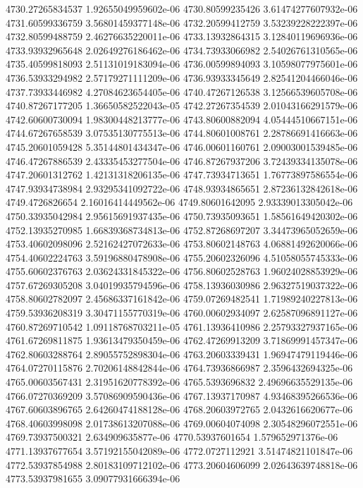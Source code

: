 {4730.27265834537 1.92655049959602e-06
4730.80599235426 3.61474277607932e-06
4731.60599336759 3.56801459377148e-06
4732.20599412759 3.53239228222397e-06
4732.80599488759 2.46276635220011e-06
4733.13932864315 3.12840119696936e-06
4733.93932965648 2.02649276186462e-06
4734.73933066982 2.54026761310565e-06
4735.40599818093 2.51131019183094e-06
4736.00599894093 3.10598077975601e-06
4736.53933294982 2.57179271111209e-06
4736.93933345649 2.82541204466046e-06
4737.73933446982 4.27084623654405e-06
4740.47267126538 3.12566539605708e-06
4740.87267177205 1.36650582522043e-05
4742.27267354539 2.01043166291579e-06
4742.60600730094 1.98300448213777e-06
4743.80600882094 4.05444510667151e-06
4744.67267658539 3.07535130775513e-06
4744.80601008761 2.28786691416663e-06
4745.20601059428 5.35144801434347e-06
4746.00601160761 2.09003001539485e-06
4746.47267886539 2.43335453277504e-06
4746.87267937206 3.72439334135078e-06
4747.20601312762 1.42131318206135e-06
4747.73934713651 1.76773897586554e-06
4747.93934738984 2.93295341092722e-06
4748.93934865651 2.87236132842618e-06
4749.4726826654 2.16016414449562e-06
4749.80601642095 2.93339013305042e-06
4750.33935042984 2.95615691937435e-06
4750.73935093651 1.58561649420302e-06
4752.13935270985 1.66839368734813e-06
4752.87268697207 3.34473965052659e-06
4753.40602098096 2.52162427072633e-06
4753.80602148763 4.06881492620066e-06
4754.40602224763 3.59196880478908e-06
4755.20602326096 4.51058055745333e-06
4755.60602376763 2.03624331845322e-06
4756.80602528763 1.96024028853929e-06
4757.67269305208 3.04019935794596e-06
4758.13936030986 2.96327519037322e-06
4758.80602782097 2.45686337161842e-06
4759.07269482541 1.71989240227813e-06
4759.53936208319 3.30471155770319e-06
4760.00602934097 2.62587096891127e-06
4760.87269710542 1.09118768703211e-05
4761.13936410986 2.25793327937165e-06
4761.67269811875 1.93613479350459e-06
4762.47269913209 3.71869991457347e-06
4762.80603288764 2.89055752898304e-06
4763.20603339431 1.96947479119446e-06
4764.07270115876 2.70206148842844e-06
4764.73936866987 2.3596432694325e-06
4765.00603567431 2.31951620778392e-06
4765.5393696832 2.49696635529135e-06
4766.07270369209 3.57086909590436e-06
4767.13937170987 4.93468395266536e-06
4767.60603896765 2.64260474188128e-06
4768.20603972765 2.0432616620677e-06
4768.40603998098 2.01738613207088e-06
4769.00604074098 2.30548296072551e-06
4769.73937500321 2.634909635877e-06
4770.53937601654 1.579652971376e-06
4771.13937677654 3.57192155042089e-06
4772.0727112921 3.51474821101847e-06
4772.53937854988 2.80183109712102e-06
4773.20604606099 2.02643639748818e-06
4773.53937981655 3.09077931666394e-06
}
